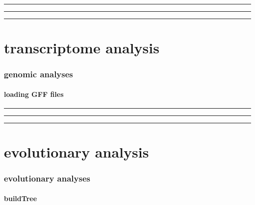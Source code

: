 \documentclass[
]{krantz}
\begin{document}
\begin{center}\rule{0.5\linewidth}{0.5pt}\end{center}

\begin{center}\rule{0.5\linewidth}{0.5pt}\end{center}

\begin{center}\rule{0.5\linewidth}{0.5pt}\end{center}

\hypertarget{part-transcriptome-analysis-1}{%
\part{transcriptome analysis}\label{part-transcriptome-analysis-1}}

\hypertarget{genomic-analyses}{%
\section{genomic analyses}\label{genomic-analyses}}

\hypertarget{loading-gff-files}{%
\subsection{loading GFF files}\label{loading-gff-files}}

\begin{center}\rule{0.5\linewidth}{0.5pt}\end{center}

\begin{center}\rule{0.5\linewidth}{0.5pt}\end{center}

\begin{center}\rule{0.5\linewidth}{0.5pt}\end{center}

\hypertarget{part-evolutionary-analysis}{%
\part{evolutionary analysis}\label{part-evolutionary-analysis}}

\hypertarget{evolutionary-analyses}{%
\section{evolutionary analyses}\label{evolutionary-analyses}}

\hypertarget{buildtree}{%
\subsection{buildTree}\label{buildtree}}
\end{document}
